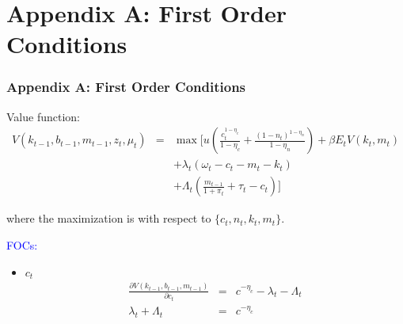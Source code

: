 \renewcommand{\theequation}{A.\arabic{equation}}
\setcounter{equation}{0}

\section{Appendix A: First Order Conditions}
\begin{frame}
\small

\frametitle{Appendix A: First Order Conditions} \vskip 0.1in

Value function:
\begin{eqnarray}\label{Eq4a.1}
V(k_{t-1}, b_{t-1}, m_{t-1}, z_{t}, \mu_{t})&=& \max
[u(\frac{c_{t}^{1-\eta_{c}}}{1-\eta_{c}}+\frac{(1-n_{t})^{1-\eta_{n}}}{1-\eta_{n}})
+\beta E_{t}V(k_{t}, m_{t}) \nonumber\\ & &  +
\lambda_{t}(\omega_{t}- c_{t}-m_{t}-k_{t})  \nonumber\\ & & +
\Lambda_{t}(\frac{m_{t-1}}{1+\pi_{t}}+\tau_{t}-c_{t})]
\end{eqnarray}

where the maximization is with respect to
$\{c_{t},n_{t},k_{t},m_{t}\}$.

\vskip 0.1in \pause

\textcolor{blue}{FOCs:}

\begin{itemize}
\item $c_{t}$
\begin{eqnarray}
\frac{\partial V(k_{t-1}, b_{t-1},m_{t-1})}{\partial c_{t}} &=&
c^{-\eta_{c}}-\lambda_{t}-\Lambda_{t}\label{Eq4a.2}\\
\lambda_{t}+\Lambda_{t} &=& c^{-\eta_{c}}\label{Eq4a.3}
\end{eqnarray}
\end{itemize}
\end{frame}

